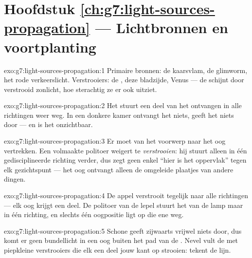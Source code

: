 \section*{Hoofdstuk \ref{ch:g7:light-sources-propagation} --- Lichtbronnen en voortplanting}

\begin{solution}{exo:g7:light-sources-propagation:1}
Primaire bronnen: de kaarsvlam, de glimworm, het rode
verkeerslicht. Verstrooiers: de , deze bladzijde, Venus ---
de  schijnt door verstrooid zonlicht, hoe sterachtig ze er ook
uitziet.
\end{solution}

\begin{solution}{exo:g7:light-sources-propagation:2}
Het stuurt een deel van het ontvangen  in alle richtingen weer
weg. In een donkere kamer ontvangt het niets, geeft het niets door ---
en is het onzichtbaar.
\end{solution}

\begin{solution}{exo:g7:light-sources-propagation:3}
Er moet  van het voorwerp naar het oog vertrekken. Een volmaakte
politoer weigert te \emph{verstrooien}: hij stuurt  alleen in
één gedisciplineerde richting verder, dus zegt geen enkel 
``hier is het oppervlak'' tegen elk gezichtspunt --- het oog ontvangt
alleen de omgeleide plaatjes van andere dingen.
\end{solution}

\begin{solution}{exo:g7:light-sources-propagation:4}
De appel verstrooit tegelijk naar alle richtingen --- elk oog krijgt
een deel. De politoer van de lepel stuurt het  van de lamp maar
in één richting, en slechts één oogpositie ligt op die ene weg.
\end{solution}

\begin{solution}{exo:g7:light-sources-propagation:5}
Schone  geeft zijwaarts vrijwel niets door, dus komt er geen
bundellicht in een oog buiten het pad van de . Nevel vult de
 met piepkleine verstrooiers die elk een deel jouw kant op
strooien:  tekent de lijn.
\end{solution}

